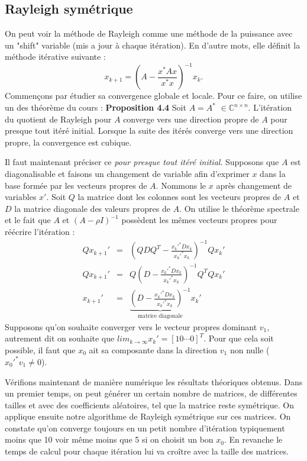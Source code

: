 \subsection*{Rayleigh symétrique}
On peut voir la méthode de Rayleigh comme une méthode de la puissance avec un "shift" variable (mis a jour à chaque itération). En d'autre mots, elle définit la méthode itérative suivante : 
$$x_{k+1} = \left(  A- \frac{x^*Ax}{x^*x}  \right)^{-1} x_k.  $$
Commençons par étudier sa convergence globale et locale. Pour ce faire, on utilise un des théorème du cours : 
\textbf{Proposition 4.4} Soit $A = A^*$ $ \in \mathbb{C}^{n\times n}$. L'itération du quotient de Rayleigh pour $A$ converge vers une direction propre de $A$ pour presque tout itéré initial. Lorsque la suite des itérés converge vers une direction propre, la convergence est cubique. 

Il faut maintenant préciser ce \textit{pour presque tout itéré initial}. Supposons que $A$ est diagonalisable et faisons un changement de variable afin d'exprimer $x$ dans la base formée par les vecteurs propres de $A$. Nommons le $x$ après changement de variables $x'$. Soit $Q$ la matrice dont les colonnes sont les vecteurs propres de $A$ et $D$ la matrice diagonale des valeurs propres de $A$. On utilise le théorème spectrale et le fait que $A$ et $(A-\rho I)^{-1}$ possèdent les mêmes vecteurs propres pour réécrire l'itération : 
\begin{eqnarray}
Qx_{k+1}' & = &(Q D Q^T - \frac{x_k'^* D x_k}{x_k'^* x_k})^{-1} Qx_{k}'\\
Qx_{k+1}' & = & Q(D-\frac{x_k'^* D x_k}{x_k'^* x_k})^{-1}Q^T Qx_k'\\
x_{k+1}' & = & \underbrace{(D-\frac{x_k'^* D x_k}{x_k'^* x_k})^{-1}}_{\text{matrice diagonale}} x_k'
\end{eqnarray}
Supposons qu'on souhaite converger vers le vecteur propres dominant $v_1$, autrement dit on souhaite que $lim_{k\rightarrow \infty} x_k' = [1 0 \cdots 0]^T$. Pour que cela soit possible, il faut que $x_0$ ait sa composante dans la direction $v_1$ non nulle ($x_0'^* v_1 \neq 0$). 

Vérifions maintenant de manière numérique les résultats théoriques obtenus. Dans un premier temps, on peut générer un certain nombre de matrices, de différentes tailles et avec des coefficients aléatoires, tel que la matrice reste symétrique. On applique ensuite notre algorithme de Rayleigh symétrique sur ces matrices. On constate qu'on converge toujours en un petit nombre d'itération typiquement moins que 10 voir même moins que 5 si on choisit un bon $x_0$. En revanche le temps de calcul pour chaque itération lui va croître avec la taille des matrices.

